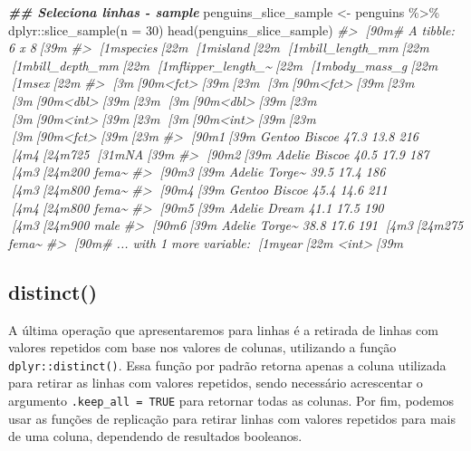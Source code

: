 \documentclass[
]{book}
\newenvironment{Shaded}{\begin{snugshade}}{\end{snugshade}}
\newcommand{\AttributeTok}[1]{\textcolor[rgb]{0.61,0.61,0.61}{#1}}
\newcommand{\CommentTok}[1]{\textcolor[rgb]{0.37,0.37,0.37}{\textit{#1}}}
\newcommand{\DecValTok}[1]{\textcolor[rgb]{0.06,0.06,0.06}{#1}}
\newcommand{\DocumentationTok}[1]{\textcolor[rgb]{0.37,0.37,0.37}{\textbf{\textit{#1}}}}
\newcommand{\FunctionTok}[1]{\textcolor[rgb]{0,0,0}{#1}}
\newcommand{\NormalTok}[1]{#1}
\newcommand{\OtherTok}[1]{\textcolor[rgb]{0.37,0.37,0.37}{#1}}
\newcommand{\SpecialCharTok}[1]{\textcolor[rgb]{0,0,0}{#1}}
\begin{document}
\begin{Shaded}
\begin{Highlighting}[]
\DocumentationTok{\#\# Seleciona linhas {-} sample}
\NormalTok{penguins\_slice\_sample }\OtherTok{\textless{}{-}}\NormalTok{ penguins }\SpecialCharTok{\%\textgreater{}\%} 
\NormalTok{  dplyr}\SpecialCharTok{::}\FunctionTok{slice\_sample}\NormalTok{(}\AttributeTok{n =} \DecValTok{30}\NormalTok{)}
\FunctionTok{head}\NormalTok{(penguins\_slice\_sample)}
\CommentTok{\#\textgreater{} [90m\# A tibble: 6 x 8[39m}
\CommentTok{\#\textgreater{}   [1mspecies[22m [1misland[22m [1mbill\_length\_mm[22m [1mbill\_depth\_mm[22m [1mflipper\_length\_\textasciitilde{}[22m [1mbody\_mass\_g[22m [1msex[22m  }
\CommentTok{\#\textgreater{}   [3m[90m\textless{}fct\textgreater{}[39m[23m   [3m[90m\textless{}fct\textgreater{}[39m[23m           [3m[90m\textless{}dbl\textgreater{}[39m[23m         [3m[90m\textless{}dbl\textgreater{}[39m[23m            [3m[90m\textless{}int\textgreater{}[39m[23m       [3m[90m\textless{}int\textgreater{}[39m[23m [3m[90m\textless{}fct\textgreater{}[39m[23m}
\CommentTok{\#\textgreater{} [90m1[39m Gentoo  Biscoe           47.3          13.8              216        [4m4[24m725 [31mNA[39m   }
\CommentTok{\#\textgreater{} [90m2[39m Adelie  Biscoe           40.5          17.9              187        [4m3[24m200 fema\textasciitilde{}}
\CommentTok{\#\textgreater{} [90m3[39m Adelie  Torge\textasciitilde{}           39.5          17.4              186        [4m3[24m800 fema\textasciitilde{}}
\CommentTok{\#\textgreater{} [90m4[39m Gentoo  Biscoe           45.4          14.6              211        [4m4[24m800 fema\textasciitilde{}}
\CommentTok{\#\textgreater{} [90m5[39m Adelie  Dream            41.1          17.5              190        [4m3[24m900 male }
\CommentTok{\#\textgreater{} [90m6[39m Adelie  Torge\textasciitilde{}           38.8          17.6              191        [4m3[24m275 fema\textasciitilde{}}
\CommentTok{\#\textgreater{} [90m\# ... with 1 more variable: [1myear[22m \textless{}int\textgreater{}[39m}
\end{Highlighting}
\end{Shaded}

\hypertarget{distinct}{%
\subsection{distinct()}\label{distinct}}

A última operação que apresentaremos para linhas é a retirada de linhas com valores repetidos com base nos valores de colunas, utilizando a função \texttt{dplyr::distinct()}. Essa função por padrão retorna apenas a coluna utilizada para retirar as linhas com valores repetidos, sendo necessário acrescentar o argumento \texttt{.keep\_all\ =\ TRUE} para retornar todas as colunas. Por fim, podemos usar as funções de replicação para retirar linhas com valores repetidos para mais de uma coluna, dependendo de resultados booleanos.
\end{document}
